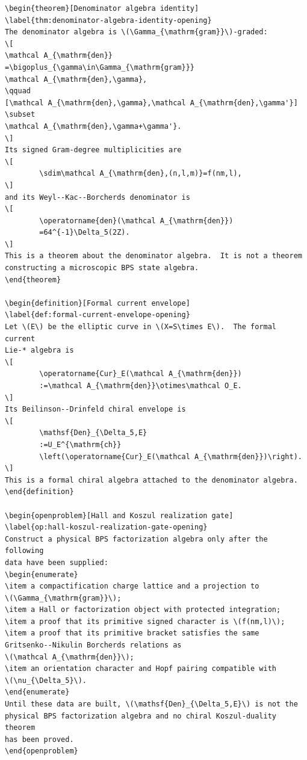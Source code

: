 \begin{verbatim}
\begin{theorem}[Denominator algebra identity]
\label{thm:denominator-algebra-identity-opening}
The denominator algebra is \(\Gamma_{\mathrm{gram}}\)-graded:
\[
\mathcal A_{\mathrm{den}}
=\bigoplus_{\gamma\in\Gamma_{\mathrm{gram}}}
\mathcal A_{\mathrm{den},\gamma},
\qquad
[\mathcal A_{\mathrm{den},\gamma},\mathcal A_{\mathrm{den},\gamma'}]
\subset
\mathcal A_{\mathrm{den},\gamma+\gamma'}.
\]
Its signed Gram-degree multiplicities are
\[
        \sdim\mathcal A_{\mathrm{den},(n,l,m)}=f(nm,l),
\]
and its Weyl--Kac--Borcherds denominator is
\[
        \operatorname{den}(\mathcal A_{\mathrm{den}})
        =64^{-1}\Delta_5(2Z).
\]
This is a theorem about the denominator algebra.  It is not a theorem
constructing a microscopic BPS state algebra.
\end{theorem}

\begin{definition}[Formal current envelope]
\label{def:formal-current-envelope-opening}
Let \(E\) be the elliptic curve in \(X=S\times E\).  The formal current
Lie-* algebra is
\[
        \operatorname{Cur}_E(\mathcal A_{\mathrm{den}})
        :=\mathcal A_{\mathrm{den}}\otimes\mathcal O_E.
\]
Its Beilinson--Drinfeld chiral envelope is
\[
        \mathsf{Den}_{\Delta_5,E}
        :=U_E^{\mathrm{ch}}
        \left(\operatorname{Cur}_E(\mathcal A_{\mathrm{den}})\right).
\]
This is a formal chiral algebra attached to the denominator algebra.
\end{definition}

\begin{openproblem}[Hall and Koszul realization gate]
\label{op:hall-koszul-realization-gate-opening}
Construct a physical BPS factorization algebra only after the following
data have been supplied:
\begin{enumerate}
\item a compactification charge lattice and a projection to
\(\Gamma_{\mathrm{gram}}\);
\item a Hall or factorization object with protected integration;
\item a proof that its primitive signed character is \(f(nm,l)\);
\item a proof that its primitive bracket satisfies the same
Gritsenko--Nikulin Borcherds relations as
\(\mathcal A_{\mathrm{den}}\);
\item an orientation character and Hopf pairing compatible with
\(\nu_{\Delta_5}\).
\end{enumerate}
Until these data are built, \(\mathsf{Den}_{\Delta_5,E}\) is not the
physical BPS factorization algebra and no chiral Koszul-duality theorem
has been proved.
\end{openproblem}
\end{verbatim}

